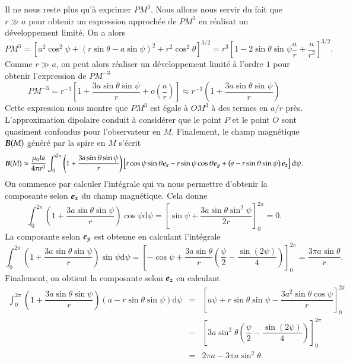 	Il ne nous reste plus qu'à exprimer $PM^3$. Nous allons nous servir du
	fait que $r \gg a$ pour obtenir un expression approchée de $PM^3$ en 
	réalisat un développement limité. On a alors
	\begin{equation*}
		PM^3 = \left[a^2\cos^2\psi + \left(r \sin \theta - a\sin \psi\right)^2 
		+ r^2 \cos^2 \theta \right]^{3/2}
		= r^3 \left[ 1 - 2\sin \theta \sin \psi \dfrac{a}{r} + \dfrac{a}{r^2}
		\right]^{3/2}.
	\end{equation*}
	Comme $r \gg a$, on peut alors réaliser un développement limité à l'ordre $1$
	pour obtenir l'expression de $PM^{-3}$
	\begin{equation*}
		PM^{-3} = r^{-3}\left[1 + \dfrac{3a\sin\theta\sin\psi}{r} +
		          o\left(\dfrac{a}{r}\right)\right] \approx
			  r^{-3} \left(1 + \dfrac{3a\sin\theta\sin\psi}{r}\right)
	\end{equation*}
	Cette expression nous montre que $PM^3$ est égale à $OM^3$ à des termes en
	$a/r$ près. L'approximation dipolaire conduit à considérer que le point $P$
	et le point $O$ sont quasiment confondus pour l'observateur en $M$.
	Finalement, le champ magnétique $\vecb(M)$ généré par la spire en $M$
	s'écrit
	\begin{equation*}
		\vecb(M) \approx \dfrac{\mu_0 Ia}{4 \pi r^3}
		\int_0^{2\pi}\left(1 + \dfrac{3a\sin\theta\sin\psi}{r}\right)
		\left[r \cos\psi\sin\theta\ex -r\sin\psi\cos\theta\ey
		+ \left(a -r\sin\theta\sin\psi\right)\ez\right]\mathrm{d}\psi.
	\end{equation*}
	On commence par calculer l'intégrale qui va nous permettre d'obtenir la composante
	selon $\ex$ du champ magnétique. Cela donne
	\begin{equation*}
		\int_0^{2\pi} \left(1 + \dfrac{3a \sin\theta\sin\psi}{r}\right)
		\cos\psi \mathrm{d}\psi = \left[\sin \psi + 
		\dfrac{3a\sin\theta\sin^2\psi}{2r} \right]^{2\pi}_0 = 0.
	\end{equation*}
	La composante selon $\ey$ est obtenue en calculant l'intégrale
	\begin{equation*}
		\int_0^{2\pi} \left(1 + \dfrac{3a \sin\theta\sin\psi}{r}\right)
		\sin \psi \mathrm{d}\psi = \left[-\cos \psi + 
			\dfrac{3a\sin\theta}{r}\left(\dfrac{\psi}{2}
			- \dfrac{\sin(2\psi)}{4}\right) \right]^{2\pi}_0 =
			\dfrac{3 \pi a \sin \theta}{r}.
	\end{equation*}
	Finalement, on obtient la composante selon $\ez$ en calculant
	\begin{equation*}
		\begin{array}{rcl}
		\displaystyle \int^{2\pi}_0 \left(1 + \dfrac{3a \sin\theta\sin\psi}{r}\right)
		\left(a - r\sin\theta\sin\psi \right)\mathrm{d}{\psi}
		&=& \left[ a \psi + r\sin\theta\sin\psi - 
		\dfrac{3a^2\sin\theta\cos\psi}{r}\right]^{2\pi}_{0} \\ 
		&-& \left[3a\sin^2\theta
		\left(\dfrac{\psi}{2} - \dfrac{\sin(2\psi)}{4}\right)
	\right]^{2\pi}_0 \\[1.5em]
		&=& 2\pi a - 3\pi a \sin^2\theta.
		\end{array}
	\end{equation*}
